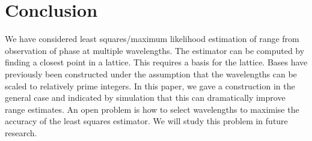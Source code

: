 \documentclass[10pt,twocolumn,twoside]{IEEEtran}
\begin{document}
 \section{Conclusion}

We have considered least squares/maximum likelihood estimation of range from observation of phase at multiple wavelengths.  The estimator can be computed by finding a closest point in a lattice.  This requires a basis for the lattice.  Bases have previously been constructed under the assumption that the wavelengths can be scaled to relatively prime integers.  In this paper, we gave a construction in the general case and indicated by simulation that this can dramatically improve range estimates.  An open problem is how to select wavelengths to maximise the accuracy of the least squares estimator.  We will study this problem in future research.


 
\end{document}
